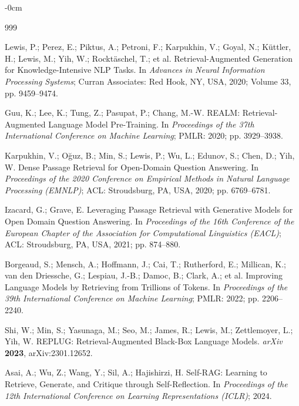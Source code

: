 \documentclass[information,article,submit,moreauthors]{Definitions/mdpi}
\begin{document}
\begin{adjustwidth}{-\extralength}{0cm}


\begin{thebibliography}{999}


Lewis, P.; Perez, E.; Piktus, A.; Petroni, F.; Karpukhin, V.; Goyal, N.; K\"uttler, H.;
Lewis, M.; Yih, W.; Rockt\"aschel, T.; et al. Retrieval-Augmented Generation for
Knowledge-Intensive NLP Tasks. In \textit{Advances in Neural Information Processing Systems};
Curran Associates: Red Hook, NY, USA, 2020; Volume 33, pp. 9459--9474.

Guu, K.; Lee, K.; Tung, Z.; Pasupat, P.; Chang, M.-W. REALM: Retrieval-Augmented Language Model
Pre-Training. In \textit{Proceedings of the 37th International Conference on Machine Learning};
PMLR: 2020; pp. 3929--3938.

Karpukhin, V.; O\u{g}uz, B.; Min, S.; Lewis, P.; Wu, L.; Edunov, S.; Chen, D.; Yih, W. Dense
Passage Retrieval for Open-Domain Question Answering. In \textit{Proceedings of the 2020
Conference on Empirical Methods in Natural Language Processing (EMNLP)}; ACL: Stroudsburg, PA,
USA, 2020; pp. 6769--6781.

Izacard, G.; Grave, E. Leveraging Passage Retrieval with Generative Models for Open Domain
Question Answering. In \textit{Proceedings of the 16th Conference of the European Chapter of
the Association for Computational Linguistics (EACL)}; ACL: Stroudsburg, PA, USA, 2021;
pp. 874--880.

Borgeaud, S.; Mensch, A.; Hoffmann, J.; Cai, T.; Rutherford, E.; Millican, K.; van den Driessche,
G.; Lespiau, J.-B.; Damoc, B.; Clark, A.; et al. Improving Language Models by Retrieving from
Trillions of Tokens. In \textit{Proceedings of the 39th International Conference on Machine
Learning}; PMLR: 2022; pp. 2206--2240.

Shi, W.; Min, S.; Yasunaga, M.; Seo, M.; James, R.; Lewis, M.; Zettlemoyer, L.; Yih, W. REPLUG:
Retrieval-Augmented Black-Box Language Models. \textit{arXiv} \textbf{2023}, arXiv:2301.12652.

Asai, A.; Wu, Z.; Wang, Y.; Sil, A.; Hajishirzi, H. Self-RAG: Learning to Retrieve, Generate,
and Critique through Self-Reflection. In \textit{Proceedings of the 12th International
Conference on Learning Representations (ICLR)}; 2024.


\end{thebibliography}
\end{adjustwidth}
\end{document}

